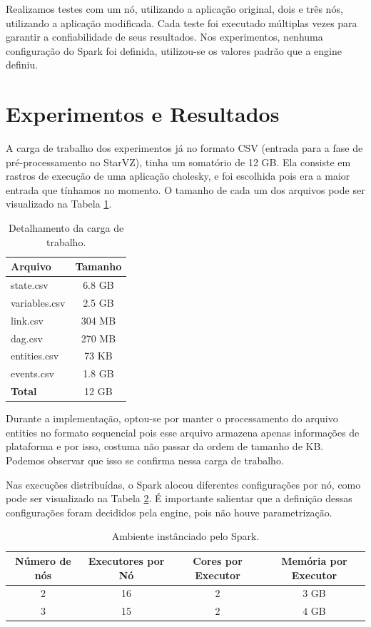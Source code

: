 Realizamos testes com um nó, utilizando a aplicação original, dois e três nós, 
utilizando a aplicação modificada. Cada teste foi executado múltiplas vezes 
para garantir a confiabilidade de seus resultados. Nos experimentos, nenhuma 
configuração do Spark foi definida, utilizou-se os valores padrão que a engine 
definiu.


\section{Experimentos e Resultados} \label{sect:results}

A carga de trabalho dos experimentos já no formato CSV (entrada para a fase de 
pré-processamento no StarVZ), tinha um somatório de 12 GB. Ela consiste em 
rastros de execução de uma aplicação cholesky, e foi escolhida pois era a maior
entrada que tínhamos no momento. O tamanho de cada um dos arquivos pode ser 
visualizado na Tabela \ref{tab:input_sz}.

\begin{table}[H]
\centering
\begin{tabular}{l c} \toprule
\textbf{Arquivo}  &  \textbf{Tamanho} \\ 
\midrule
state.csv	& 6.8 GB \\
variables.csv  	& 2.5 GB \\
link.csv       	& 304 MB \\
dag.csv        	& 270 MB \\
entities.csv	& 73 KB \\
events.csv	& 1.8 GB \\
\textbf{Total}  & 12 GB  \\
\end{tabular}
\caption{Detalhamento da carga de trabalho.}
\label{tab:input_sz}
\end{table}

Durante a implementação, optou-se por manter o processamento do arquivo entities 
no formato sequencial pois esse arquivo armazena apenas informações de 
plataforma e por isso, costuma não passar da ordem de tamanho de KB. Podemos 
observar que isso se confirma nessa carga de trabalho.

Nas execuções distribuídas, o Spark alocou diferentes configurações por nó, 
como pode ser visualizado na Tabela \ref{tab:spark_def_config}. É importante 
salientar que a definição dessas configurações foram decididos pela engine, 
pois não houve parametrização.


\begin{table}[H]
\centering
\begin{tabular}{c c c c} \toprule
\textbf{Número de nós}  &  \textbf{Executores por Nó} & \textbf{Cores por 
Executor} & \textbf{Memória por Executor} \\ 
\midrule
2	& 16 & 2 & 3 GB\\
3	& 15 & 2 & 4 GB\\
\end{tabular}
\caption{Ambiente instânciado pelo Spark.}
\label{tab:spark_def_config}
\end{table}

